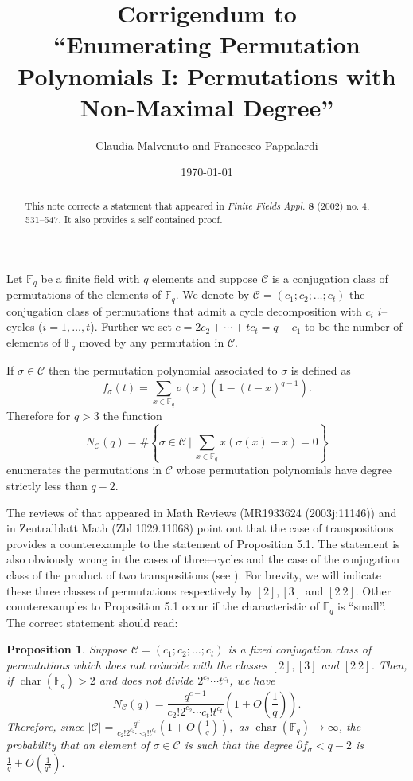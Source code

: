 \documentclass{amsart}
\title[Corrigendum]{Corrigendum to\\ ``Enumerating Permutation Polynomials I: Permutations with
Non-Maximal Degree''}
\author{Claudia Malvenuto and Francesco Pappalardi}
\date{\today}
\newcommand{\F}{\mathbb F_q}
\newtheorem{prop}{Proposition}[section]
\begin{document}
\begin{abstract}
This note corrects a statement that appeared in \textit{Finite
Fields Appl.} \textbf{8} (2002) no. 4, 531--547. It also provides a
self contained proof.
\end{abstract}
\maketitle \setcounter{section}{5}

Let $\F$ be a finite field with $q$ elements and suppose
$\mathcal{C}$ is a conjugation class of permutations of the elements
of $\F$. We denote by $\mathcal{C}=(c_1;c_2;\ldots;c_t)$ the
conjugation class of permutations that admit a cycle decomposition
with $c_i$ $i$--cycles ($i=1,\ldots,t$). Further we set
$c=2c_2+\cdots+tc_t=q-c_1$ to be the number of elements of $\F$
moved by any permutation in $\mathcal C$.

If $\sigma\in\mathcal C$ then the permutation polynomial associated
to $\sigma$ is defined as
$$f_\sigma(t)=\sum_{x\in\F}\sigma(x)\left(1-(t-x)^{q-1}\right).$$
Therefore for $q>3$ the function
$$N_\mathcal{C}(q)=\#\left\{\sigma\in\mathcal{C}\ |\
\sum_{x\in\F}x(\sigma(x)-x)=0\right\}$$ enumerates the permutations
in $\mathcal C$ whose permutation polynomials have degree strictly
less than $q-2$.

The reviews of \cite{CP} that appeared in Math Reviews (MR1933624
(2003j:11146)) and in Zentralblatt Math (Zbl 1029.11068) point out
that the case of transpositions provides a counterexample to the
statement of Proposition 5.1. The statement is also obviously wrong
in the cases of three--cycles and the case  of the conjugation class
of the product of two transpositions (see \cite[Theorems 1.1 and
3.1]{CP}). For brevity, we will indicate these three classes of
permutations respectively by $[2], [3]$ and $[2\ 2]$. Other
counterexamples to Proposition 5.1 occur if the characteristic of
$\F$ is ``small''. The correct statement should read:

\begin{prop} Suppose $\mathcal{C}=(c_1;c_2;\ldots;c_t)$
is a fixed conjugation class of permutations which does not coincide with
the classes $[2], [3]$ and $[2\ 2]$. Then,
if $\operatorname{char}(\F)>2$ and does not divide $2^{c_2}\cdots t^{c_t}$,
we have
$$N_\mathcal{C}(q)=\frac{q^{c-1}}{c_2!2^{c_2}\cdots c_t!t^{c_t}}
\left(1+O\left(\frac{1}{q}\right)\right).$$
Therefore, since
$|\mathcal{C}|=\frac{q^{c}}{c_2!2^{c_2}\cdots
c_t!t^{c_t}}\left(1+O\left(\frac{1}{q}\right)\right),$ as
$\operatorname{char}(\F)\rightarrow\infty$, the probability that an
element of $\sigma\in\mathcal{C}$ is such that the degree $\partial
f_\sigma<q-2$ is $\frac{1}{q}+O\left(\frac{1}{q^2}\right).$
\end{prop}
\end{document}
